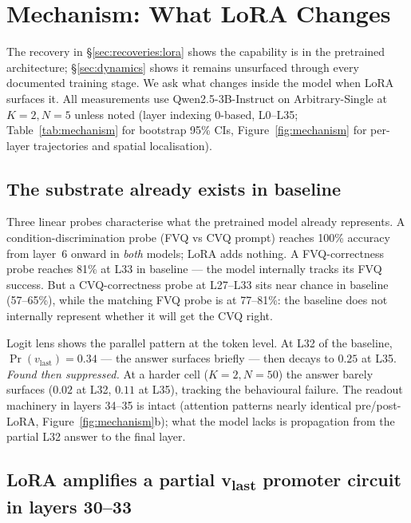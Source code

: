 \documentclass[11pt]{article}
\begin{document}
\section{Mechanism: What LoRA Changes}
\label{sec:mechanism}

The recovery in \S\ref{sec:recoveries:lora} shows the capability
is in the pretrained architecture; \S\ref{sec:dynamics} shows it
remains unsurfaced through every documented training stage. We ask
what changes inside the model when LoRA surfaces it. All
measurements use Qwen2.5-3B-Instruct on Arbitrary-Single at
$K{=}2, N{=}5$ unless noted (layer indexing 0-based,
L0--L35; Table~\ref{tab:mechanism} for bootstrap 95\% CIs,
Figure~\ref{fig:mechanism} for per-layer trajectories and spatial
localisation).

\subsection{The substrate already exists in baseline}
\label{sec:mechanism:substrate}

Three linear probes characterise what the pretrained model already
represents. A condition-discrimination probe (FVQ vs CVQ prompt)
reaches 100\% accuracy from layer~6 onward in \emph{both} models;
LoRA adds nothing. A FVQ-correctness probe reaches 81\% at L33 in
baseline --- the model internally tracks its FVQ success. But a
CVQ-correctness probe at L27--L33 sits near chance in baseline
(57--65\%), while the matching FVQ probe is at 77--81\%: the
baseline does not internally represent whether it will get the CVQ
right.

Logit lens shows the parallel pattern at the token level. At L32
of the baseline, $\Pr(v_{\text{last}}){=}0.34$ --- the answer
surfaces briefly --- then decays to $0.25$ at L35.
\emph{Found then suppressed.} At a harder cell ($K{=}2, N{=}50$)
the answer barely surfaces ($0.02$ at L32, $0.11$ at L35),
tracking the behavioural failure. The readout machinery in layers
34--35 is intact (attention patterns nearly identical pre/post-LoRA,
Figure~\ref{fig:mechanism}b); what the model lacks is propagation
from the partial L32 answer to the final layer.

\subsection{LoRA amplifies a partial v\textsubscript{last} promoter
circuit in layers 30--33}
\label{sec:mechanism:promoter}
\end{document}
